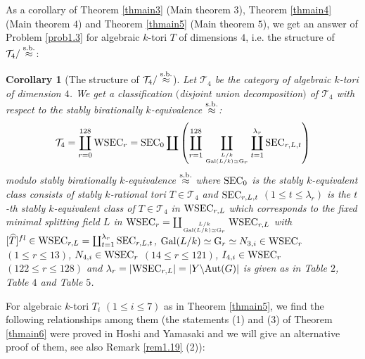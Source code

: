 \documentclass{amsart}
\theoremstyle{plain}
\newtheorem{corollary}[theorem]{Corollary}
\theoremstyle{definition}
\theoremstyle{remark}
\begin{document}
As a corollary of Theorem \ref{thmain3} (Main theorem $3$), 
Theorem \ref{thmain4} (Main theorem $4$) 
and Theorem \ref{thmain5} (Main theorem $5$), 
we get an answer of Problem \ref{prob1.3} 
for algebraic $k$-tori $T$ of dimensions $4$, 
i.e. the structure of $\mathcal{T}_4/\stackrel{\rm s.b.}{\approx}$: 

\begin{corollary}[The structure of $\mathcal{T}_4/\stackrel{\rm s.b.}{\approx}$]\label{cor1.38}
Let $\mathcal{T}_4$ be the category of algebraic $k$-tori of dimension $4$. 
We get a classification $($disjoint union decomposition$)$ 
of $\mathcal{T}_4$ with respect to 
the stably birationally $k$-equivalence $\stackrel{\rm s.b.}{\approx}$: 
\begin{align*}
\mathcal{T}_4=\coprod_{r=0}^{128} {\rm WSEC}_r
={\rm SEC}_0\coprod
\left(\coprod_{r=1}^{128} 
\coprod_{L/k\atop {\rm Gal}(L/k)\simeq {\rm G}_r}
\coprod_{t=1}^{\lambda_{r}} {\rm SEC}_{r,L,t}\right)
\end{align*}
modulo stably birationally $k$-equivalence $\stackrel{\rm s.b.}{\approx}$ 
where ${\rm SEC}_0$ is the stably $k$-equivalent class consists of 
stably $k$-rational tori $T\in \mathcal{T}_4$ %
and 
${\rm SEC}_{r,L,t}$ $(1\leq t\leq \lambda_{r})$ is the $t$-th 
stably $k$-equivalent class of $T\in \mathcal{T}_4$ %
in 
${\rm WSEC}_{r,L}$ which corresponds to the fixed minimal splitting field $L$ 
in 
${\rm WSEC}_r=\coprod_{L/k\atop {\rm Gal}(L/k)\simeq {\rm G}_r} {\rm WSEC}_{r,L}$ 
with 
$[\widehat{T}]^{fl}\in {\rm WSEC}_{r,L}
=\coprod_{t=1}^{\lambda_r} {\rm SEC}_{r,L,t}$, 
${\rm Gal}(L/k)\simeq {\rm G}_r\simeq N_{3,i}\in {\rm WSEC}_r$ $(1\leq r\leq 13)$, 
$N_{4,i}\in {\rm WSEC}_r$ $(14\leq r\leq 121)$, $I_{4,i}\in {\rm WSEC}_r$ $(122\leq r\leq 128)$ and 
$\lambda_r=|{\rm WSEC}_{r,L}|=|Y\backslash {\rm Aut}(G)|$ 
is given as in Table $2$, Table $4$ and Table $5$. 
\end{corollary}

For algebraic $k$-tori $T_i$ $(1\leq i\leq 7)$ as in Theorem \ref{thmain5}, 
we find the following relationships among them 
(the statements (1) and (3) of Theorem \ref{thmain6} were proved in 
Hoshi and Yamasaki \cite[Theorem 1.27]{HY17} and we will give 
an alternative proof of them, see also Remark \ref{rem1.19} (2)):
\end{document}
